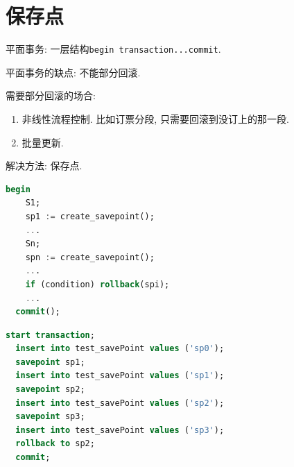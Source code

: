 \section{保存点}

平面事务: 一层结构\verb|begin transaction...commit|.

平面事务的缺点: 不能部分回滚.

需要部分回滚的场合:
\begin{enumerate}
    \item 非线性流程控制. 比如订票分段, 只需要回滚到没订上的那一段.
    \item 批量更新.
\end{enumerate}

解决方法: 保存点.
\begin{lstlisting}[language=SQL]
  begin
    S1;
    sp1 := create_savepoint();
    ...
    Sn;
    spn := create_savepoint();
    ...
    if (condition) rollback(spi);
    ...
  commit();
\end{lstlisting}

\begin{lstlisting}[language=SQL]
  start transaction;
  insert into test_savePoint values ('sp0');
  savepoint sp1;
  insert into test_savePoint values ('sp1');
  savepoint sp2;
  insert into test_savePoint values ('sp2');
  savepoint sp3;
  insert into test_savePoint values ('sp3');
  rollback to sp2;
  commit;
\end{lstlisting}